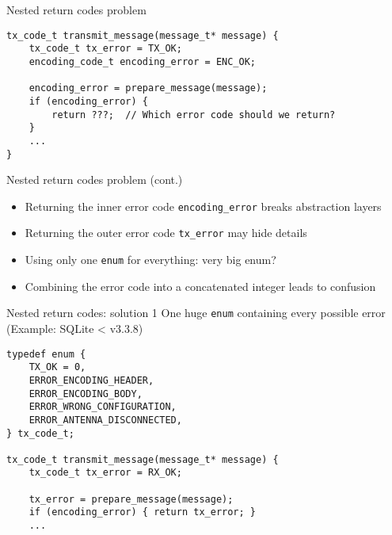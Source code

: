 \documentclass[aspectratio=169,14pt]{beamer}
\begin{document}
\begin{frame}[fragile]{Nested return codes problem}
\begin{lstlisting}[style=cstyle]
tx_code_t transmit_message(message_t* message) {
    tx_code_t tx_error = TX_OK;
    encoding_code_t encoding_error = ENC_OK;
    
    encoding_error = prepare_message(message);
    if (encoding_error) {
        return ???;  // Which error code should we return?
    }
    ...
}
\end{lstlisting}
\end{frame}



\begin{frame}{Nested return codes problem (cont.)}
\begin{itemize}
    \item Returning the inner error code \texttt{encoding\_error} breaks abstraction layers
    \item Returning the outer error code \texttt{tx\_error} may hide details
    \item Using only one \texttt{enum} for everything: very big enum?
    \item Combining the error code into a concatenated integer leads to confusion
\end{itemize}
\end{frame}



\begin{frame}[fragile]{Nested return codes: solution 1}
One huge \texttt{enum} containing every possible error\\
(Example: SQLite < v3.3.8)

\begin{lstlisting}[style=cstyle]
typedef enum {
    TX_OK = 0,
    ERROR_ENCODING_HEADER,
    ERROR_ENCODING_BODY,
    ERROR_WRONG_CONFIGURATION,
    ERROR_ANTENNA_DISCONNECTED,
} tx_code_t;

tx_code_t transmit_message(message_t* message) {
    tx_code_t tx_error = RX_OK;
    
    tx_error = prepare_message(message);
    if (encoding_error) { return tx_error; }
    ...
\end{lstlisting}
\end{frame}
\end{document}
